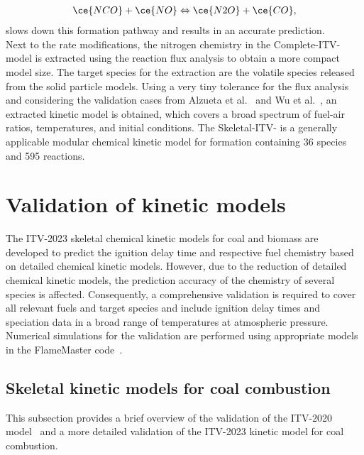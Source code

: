\begin{refsection}
\begin{align}
\ce{NCO}+\ce{NO} \Leftrightarrow \ce{N2O}+\ce{CO},
\end{align}
slows down this  formation pathway and results in an accurate  prediction.
\\
Next to the rate modifications, the nitrogen chemistry in the Complete-ITV- model is extracted using the reaction flux analysis to obtain a more compact model size. The target species for the extraction are the volatile species released from the solid particle models. Using a very tiny tolerance for the flux analysis and considering the validation cases from Alzueta et al.~\cite{Alzueta2002} and Wu et al.~\cite{Wu2019, Wu2022}, an extracted kinetic model is obtained, which covers a broad spectrum of fuel-air ratios, temperatures, and initial conditions. The Skeletal-ITV- is a generally applicable modular chemical kinetic model for  formation containing 36 species and 595 reactions.




\newpage
\section{Validation of kinetic models}
The ITV-2023 skeletal chemical kinetic models for coal and biomass are developed to predict the ignition delay time and respective fuel chemistry based on detailed chemical kinetic models. However, due to the reduction of detailed chemical kinetic models, the prediction accuracy of the chemistry of several species is affected. Consequently, a comprehensive validation is required to cover all relevant fuels and target species and include ignition delay times and speciation data in a broad range of temperatures at atmospheric pressure. Numerical simulations for the validation are performed using appropriate models in the FlameMaster code~\cite{Pitsch1990}.


 
\subsection{Skeletal kinetic models for coal combustion}
This subsection provides a brief overview of the validation of the ITV-2020 model~\cite{Cai2020} and a more detailed validation of the ITV-2023 kinetic model for coal combustion.



\end{refsection}
